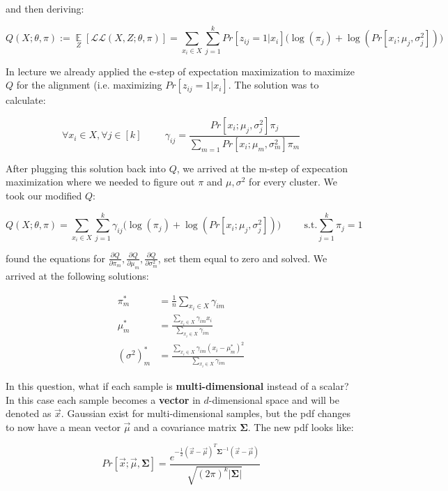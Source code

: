 \documentclass[11pt]{article}
\begin{document}
\noindent and then deriving:

$$Q(X;\theta,\pi) := \mathop{\mathbb{E}}\limits_{Z}[\mathcal{LL}(X,Z;\theta,\pi)] = \sum\limits_{x_i\in X} \sum\limits_{j=1}^k Pr[z_{ij}=1|x_i]\Big(\log(\pi_j) + \log(Pr[x_i;\mu_j,\sigma^2_j])\Big)$$

\noindent In lecture we already applied the e-step of expectation maximization to maximize $Q$ for the alignment (i.e. maximizing $Pr[z_{ij}=1|x_i]$. The solution was to calculate:

$$\forall x_i\in X,\forall j\in [k]\hspace{1cm}\gamma_{ij} = \frac{Pr[x_i;\mu_j,\sigma^2_j]\pi_j}{\sum\limits_{m=1}Pr[x_i;\mu_m,\sigma^2_m]\pi_m}$$

\noindent After plugging this solution back into $Q$, we arrived at the m-step of expecation maximization where we needed to figure out $\pi$ and $\mu, \sigma^2$ for every cluster. We took our modified $Q$:

$$Q(X;\theta,\pi) = \sum\limits_{x_i\in X} \sum\limits_{j=1}^k \gamma_{ij}\Big(\log(\pi_j) + \log(Pr[x_i;\mu_j,\sigma^2_j])\Big) \hspace{1cm} \text{s.t.} \sum\limits_{j=1}^k \pi_j = 1$$

\noindent found the equations for $\frac{\partial Q}{\partial \pi_m}, \frac{\partial Q}{\partial \mu_m}, \frac{\partial Q}{\partial \sigma^2_m}$, set them equal to zero and solved. We arrived at the following solutions:

\begin{align*}
    \pi^{*}_m &= \frac{1}{n}\sum\limits_{x_i\in X} \gamma_{im}\\
    \mu^{*}_m &= \frac{\sum\limits_{x_i\in X}\gamma_{im}x_i}{\sum\limits_{x_i\in X}\gamma_{im}}\\
    (\sigma^2)^{*}_m &= \frac{\sum\limits_{x_i\in X}\gamma_{im}(x_i-\mu^{*}_m)^2}{\sum\limits_{x_i\in X}\gamma_{im}}
\end{align*}


\noindent In this question, what if each sample is \textbf{multi-dimensional} instead of a scalar? In this case each sample becomes a \textbf{vector} in $d$-dimensional space and will be denoted as $\vec{x}$. Gaussian exist for multi-dimensional samples, but the pdf changes to now have a mean vector $\vec{\mu}$ and a covariance matrix $\mathbf{\Sigma}$. The new pdf looks like:

$$Pr[\vec{x} ; \vec{\mu}, \mathbf{\Sigma}] = \frac{e^{-\frac{1}{2}(\vec{x}-\vec{\mu})^{T}\mathbf{\Sigma}^{-1}(\vec{x}-\vec{\mu})}}{\sqrt{(2\pi)^{k} |\mathbf{\Sigma}|}}$$
\end{document}
